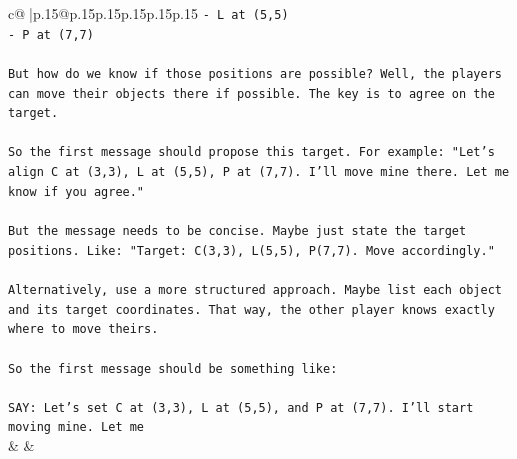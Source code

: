 \documentclass{article}
\begin{document}
{\begin{supertabular}{c@{$\;$}|p{.15\linewidth}@{}p{.15\linewidth}p{.15\linewidth}p{.15\linewidth}p{.15\linewidth}p{.15\linewidth}}
{{{\texttt{{-} L at (5,5)} \\
\texttt{{-} P at (7,7)} \\
\\ 
\texttt{But how do we know if those positions are possible? Well, the players can move their objects there if possible. The key is to agree on the target.} \\
\\ 
\texttt{So the first message should propose this target. For example: "Let's align C at (3,3), L at (5,5), P at (7,7). I'll move mine there. Let me know if you agree."} \\
\\ 
\texttt{But the message needs to be concise. Maybe just state the target positions. Like: "Target: C(3,3), L(5,5), P(7,7). Move accordingly."} \\
\\ 
\texttt{Alternatively, use a more structured approach. Maybe list each object and its target coordinates. That way, the other player knows exactly where to move theirs.} \\
\\ 
\texttt{So the first message should be something like:} \\
\\ 
\texttt{SAY: Let's set C at (3,3), L at (5,5), and P at (7,7). I'll start moving mine. Let me} \\
            }
        }
    }
    & & \\ \\


\end{supertabular}}
\end{document}
